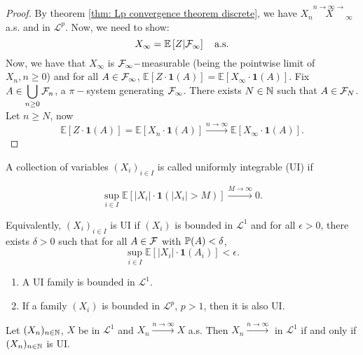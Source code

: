 \documentclass{article}
\begin{document}
\begin{proof}
	By theorem \ref{thm: Lp convergence theorem discrete}, we have $ X_{n}\stackrel{n\to \infty\longrightarrow}X_{\infty}$ a.s. and in $ \mathcal{L}^{p} $. Now, we need to show:
	\[
	X_{\infty} = \mathbb{E}\left[ Z|\mathcal{F}_{\infty} \right]\quad \text{a.s.}
	\]
Now, we have that $ X_{\infty}$ is $ \mathcal{F}_{\infty}-$measurable (being the pointwise limit of $ X_{n}, n\geq 0$) and for all $ A\in \mathcal{F}_{\infty}$, $ \mathbb{E}\left[ Z\cdot \mathbf{1}(A) \right] = \mathbb{E}\left[ X_{\infty}\cdot \mathbf{1}(A) \right]$. Fix $ A\in\displaystyle\bigcup_{n\geq 0}\mathcal{F}_{n} $, a $ \pi-$system generating $ \mathcal{F}_{\infty}$. There exists $ N\in \mathbb{N}$ such that $ A\in \mathcal{F}_{N}$. Let $ n\geq N$, now 
\[
	\mathbb{E}\left[ Z\cdot \mathbf{1}(A) \right] = \mathbb{E}\left[ X_{n}\cdot \mathbf{1}(A) \right]\stackrel{n\to \infty}{\longrightarrow} \mathbb{E}\left[ X_{\infty}\cdot \mathbf{1}(A) \right].
\]
\end{proof}

\begin{boxdef}\label{def: UI}
A collection of variables $ (X_{i})_{i\in I}$ is called uniformly integrable (UI) if 

\[
	\displaystyle\sup_{i\in I} \mathbb{E}\left[ |X_{i}|\cdot \mathbf{1}(|X_{i}|> M) \right]\stackrel{M\to \infty}{\longrightarrow}0.
\]
\end{boxdef}

Equivalently, $ (X_{i})_{i\in I}$ is UI if $ (X_{i})$ is bounded in $ \mathcal{L}^{1} $ and for all $ \epsilon>0$, there exists $ \delta >0$ such that for all $ A\in \mathcal{F}$ with $ \mathbb{P}(A)<\delta$, 
\[
	\displaystyle\sup_{i\in I} \mathbb{E}\left[ |X_{i}|\cdot \mathbf{1}(A_{i}) \right]<\epsilon.
\]
\begin{enumerate}[label = (\roman*)]
	\item A UI family is bounded in $ \mathcal{L}^{1} $. 
	\item If a family $ (X_{i})$ is bounded in $ \mathcal{L}^{p} $, $ p>1$, then it is also UI.
\end{enumerate}

\begin{boxlemma}\label{lemma: UI a.s. conv}
	Let $ (X_{n})_{n\in \mathbb{N}}$, $ X$ be in $ \mathcal{L}^{1} $ and $ X_{n}\stackrel{n\to \infty}{\longrightarrow}X$ a.s. Then $ X_{n}\stackrel{n\to \infty}{\longrightarrow}$ in $ \mathcal{L}^{1} $ if and only if $ (X_{n})_{n\in \mathbb{N}}$ is UI.
\end{boxlemma}
\end{document}
